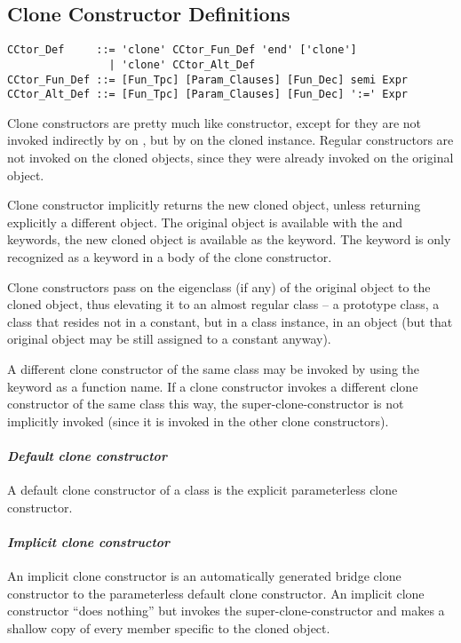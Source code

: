 \subsection{Clone Constructor Definitions}
\label{sec:clone-def}

\syntax\begin{lstlisting}
CCtor_Def     ::= 'clone' CCtor_Fun_Def 'end' ['clone']
                | 'clone' CCtor_Alt_Def
CCtor_Fun_Def ::= [Fun_Tpc] [Param_Clauses] [Fun_Dec] semi Expr
CCtor_Alt_Def ::= [Fun_Tpc] [Param_Clauses] [Fun_Dec] ':=' Expr
\end{lstlisting}

Clone constructors are pretty much like constructor, except for they are not invoked indirectly by  on , but by  on the cloned instance. Regular constructors are not invoked on the cloned objects, since they were already invoked on the original object. 

Clone constructor implicitly returns the new cloned object, unless returning explicitly a different object. The original object is available with the  and  keywords, the new cloned object is available as the  keyword. The  keyword is only recognized as a keyword in a body of the clone constructor. 

Clone constructors pass on the eigenclass (if any) of the original object to the cloned object, thus elevating it to an almost regular class -- a prototype class, a class that resides not in a constant, but in a class instance, in an object (but that original object may be still assigned to a constant anyway). 

A different clone constructor of the same class may be invoked by using the  keyword as a function name. If a clone constructor invokes a different clone constructor of the same class this way, the super-clone-constructor is not implicitly invoked (since it is invoked in the other clone constructors). 

\paragraph{\em Default clone constructor}
A default clone constructor of a class is the explicit parameterless clone constructor. 

\paragraph{\em Implicit clone constructor}
An implicit clone constructor is an automatically generated bridge clone constructor to the parameterless default clone constructor. An implicit clone constructor ``does nothing'' but invokes the super-clone-constructor and makes a shallow copy of every member specific to the cloned object. 

